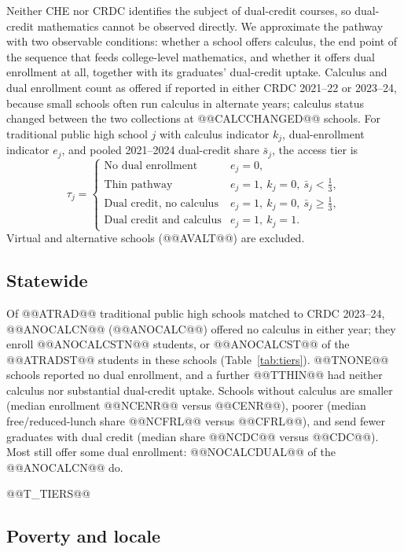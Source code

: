 \documentclass[aps,prd,reprint,superscriptaddress,nofootinbib,floatfix]{revtex4-2}
\begin{document}
Neither CHE nor CRDC identifies the subject of dual-credit courses, so dual-credit mathematics cannot be observed directly. We approximate the pathway with two observable conditions: whether a school offers calculus, the end point of the sequence that feeds college-level mathematics, and whether it offers dual enrollment at all, together with its graduates' dual-credit uptake. Calculus and dual enrollment count as offered if reported in either CRDC 2021--22 or 2023--24, because small schools often run calculus in alternate years; calculus status changed between the two collections at @@CALCCHANGED@@ schools. For traditional public high school $j$ with calculus indicator $k_j$, dual-enrollment indicator $e_j$, and pooled 2021--2024 dual-credit share $\bar s_j$, the access tier is
\begin{equation}
\tau_j=\begin{cases}
\text{No dual enrollment} & e_j=0,\\
\text{Thin pathway} & e_j=1,\ k_j=0,\ \bar s_j<\tfrac13,\\
\text{Dual credit, no calculus} & e_j=1,\ k_j=0,\ \bar s_j\geq\tfrac13,\\
\text{Dual credit and calculus} & e_j=1,\ k_j=1.
\end{cases}\label{eq:tier}
\end{equation}
Virtual and alternative schools (@@AVALT@@) are excluded.

\subsection{Statewide}

Of @@ATRAD@@ traditional public high schools matched to CRDC 2023--24, @@ANOCALCN@@ (@@ANOCALC@@) offered no calculus in either year; they enroll @@ANOCALCSTN@@ students, or @@ANOCALCST@@ of the @@ATRADST@@ students in these schools (Table~\ref{tab:tiers}). @@TNONE@@ schools reported no dual enrollment, and a further @@TTHIN@@ had neither calculus nor substantial dual-credit uptake. Schools without calculus are smaller (median enrollment @@NCENR@@ versus @@CENR@@), poorer (median free/reduced-lunch share @@NCFRL@@ versus @@CFRL@@), and send fewer graduates with dual credit (median share @@NCDC@@ versus @@CDC@@). Most still offer some dual enrollment: @@NOCALCDUAL@@ of the @@ANOCALCN@@ do.

@@T_TIERS@@

\subsection{Poverty and locale}
\end{document}
